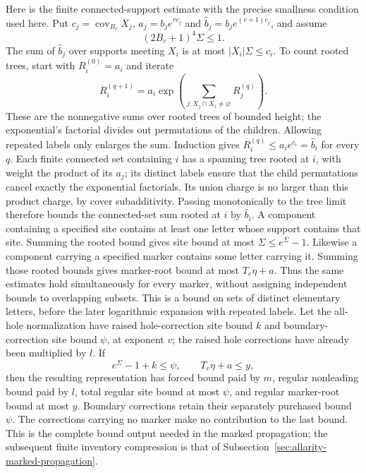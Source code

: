 Here is the finite connected-support estimate with the precise smallness
condition used here. Put $c_j=\operatorname{cov}_{B_c}X_j$,
$a_j=b_j e^{vc_j}$ and $\widehat b_j=b_j e^{(v+1)c_j}$, and assume
\[
                (2B_c+1)^4\Sigma\le1.
\]
The sum of $\widehat b_j$ over supports meeting $X_i$ is at most
$|X_i|\Sigma\le c_i$. To count rooted trees, start with
$R_i^{(0)}=a_i$ and iterate
\[
 R_i^{(q+1)}=a_i\exp\left(\sum_{j:X_j\cap X_i\ne\varnothing}
                                       R_j^{(q)}\right).
\]
These are the nonnegative sums over rooted trees of bounded height;
the exponential's factorial divides out permutations of the children.
Allowing repeated labels only enlarges the sum. Induction gives
$R_i^{(q)}\le a_i e^{c_i}=\widehat b_i$ for every $q$.
Each finite connected set containing $i$ has a spanning tree rooted at
$i$, with weight the product of its $a_j$; its distinct labels ensure
that the child permutations cancel exactly the exponential factorials.
Its union charge is no larger than this product charge, by cover
subadditivity. Passing monotonically to the tree limit therefore bounds
the connected-set sum rooted at $i$ by $\widehat b_i$.
A component containing a specified site contains at least one letter
whose support contains that site. Summing the rooted bound gives site
bound at most $\Sigma\le e^\Sigma-1$. Likewise a component carrying
a specified marker contains some letter carrying it. Summing those
rooted bounds gives marker-root bound at most $T_e\eta+a$. Thus the
same estimates hold simultaneously for every marker, without assigning
independent bounds to overlapping subsets. This is a bound on sets of
distinct elementary letters, before the later logarithmic expansion
with repeated labels.
Let the all-hole normalization have raised hole-correction site bound
$k$ and boundary-correction site bound $\psi$, at exponent $v$; the
raised hole corrections have already been multiplied by $l$. If
\begin{equation}\label{eq:mixed-finish-price}
       e^\Sigma-1+k\le\psi,\qquad T_e\eta+a\le y,
\end{equation}
then the resulting representation has forced bound paid by $m$, regular
nonleading bound paid by $l$, total regular site bound at most $\psi$,
and regular marker-root bound at most $y$. Boundary corrections retain
their separately purchased bound $\psi$. The corrections carrying no
marker make no contribution to the last bound. This is the complete
bound output needed in the marked propagation; the subsequent finite
inventory compression is that of Subsection~\ref{sec:allarity-marked-propagation}.

